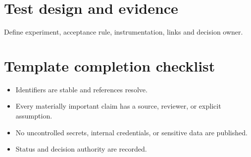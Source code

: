 \documentclass[10pt,letterpaper]{article}
\begin{document}
\section{Test design and evidence}
Define experiment, acceptance rule, instrumentation, links and decision owner.

\section{Template completion checklist}
\begin{itemize}
\item Identifiers are stable and references resolve.
\item Every materially important claim has a source, reviewer, or explicit assumption.
\item No uncontrolled secrets, internal credentials, or sensitive data are published.
\item Status and decision authority are recorded.
\end{itemize}
\end{document}
